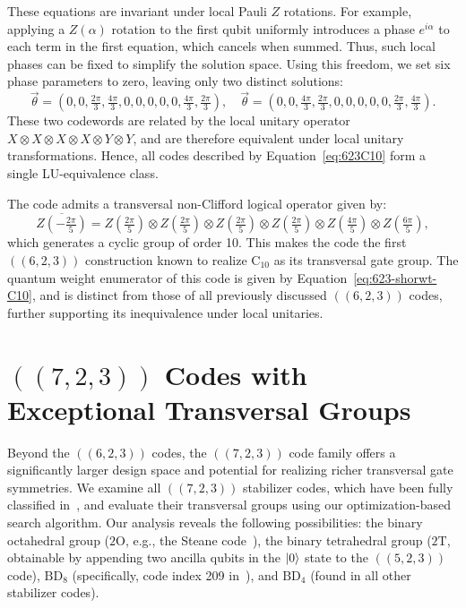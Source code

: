 \documentclass[8pt]{article}
\theoremstyle{definition}
\begin{document}
These equations are invariant under local Pauli \(Z\) rotations. For example, applying a \(Z(\alpha)\) rotation to the first qubit uniformly introduces a phase \(e^{i\alpha}\) to each term in the first equation, which cancels when summed. Thus, such local phases can be fixed to simplify the solution space. Using this freedom, we set six phase parameters to zero, leaving only two distinct solutions:
\[ \vec{\theta} = \left(0, 0, \tfrac{2\pi}{3}, \tfrac{4\pi}{3}, 0, 0, 0, 0, 0, \tfrac{4\pi}{3}, \tfrac{2\pi}{3}\right), \quad
    \vec{\theta} = \left(0, 0, \tfrac{4\pi}{3}, \tfrac{2\pi}{3}, 0, 0, 0, 0, 0, \tfrac{2\pi}{3}, \tfrac{4\pi}{3}\right).\]
These two codewords are related by the local unitary operator \(X \otimes X \otimes X \otimes X \otimes Y \otimes Y\), and are therefore equivalent under local unitary transformations. Hence, all codes described by Equation~\eqref{eq:623C10} form a single LU-equivalence class.

The code admits a transversal non-Clifford logical operator given by:
\[ \overline{Z\left(-\tfrac{2\pi}{5}\right)}=Z\left(\tfrac{2\pi}{5}\right)\otimes Z\left(\tfrac{2\pi}{5}\right)\otimes Z\left(\tfrac{2\pi}{5}\right)\otimes Z\left(\tfrac{2\pi}{5}\right)\otimes Z\left(\tfrac{4\pi}{5}\right)\otimes Z\left(\tfrac{6\pi}{5}\right), \]
which generates a cyclic group of order 10. This makes the code the first \(((6,2,3))\) construction known to realize \(\mathrm{C}_{10}\) as its transversal gate group. The quantum weight enumerator of this code is given by Equation~\eqref{eq:623-shorwt-C10}, and is distinct from those of all previously discussed \(((6,2,3))\) codes, further supporting its inequivalence under local unitaries.

\section{\texorpdfstring{$((7,2,3))$}{((7,2,3))} Codes with Exceptional Transversal Groups}

Beyond the \(((6,2,3))\) codes, the \(((7,2,3))\) code family offers a significantly larger design space and potential for realizing richer transversal gate symmetries. We examine all \(((7,2,3))\) stabilizer codes, which have been fully classified in~\cite{cross2025small}, and evaluate their transversal groups using our optimization-based search algorithm. Our analysis reveals the following possibilities: the binary octahedral group (\(2\mathrm{O}\), e.g., the Steane code~\cite{steane1996simple}), the binary tetrahedral group (\(2\mathrm{T}\), obtainable by appending two ancilla qubits in the \(\ket{0}\) state to the \(((5,2,3))\) code), \(\mathrm{BD}_8\) (specifically, code index 209 in~\cite{cross2025small}), and \(\mathrm{BD}_4\) (found in all other stabilizer codes).
\end{document}
